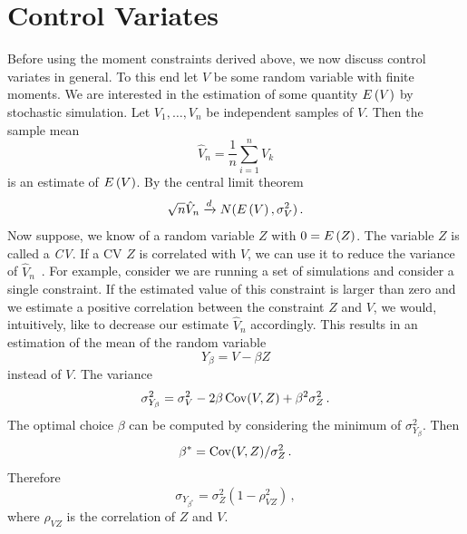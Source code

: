 \section{Control Variates}\label{sec:cv:var_red}
Before using the moment constraints derived above, we now discuss
control variates in general.
To this end let $V$ be some random variable with finite moments.
We are interested in the estimation of some quantity ${E}\left(V\right)$
by stochastic simulation.
Let $V_1,\dots,V_n$ be independent samples of $V$.
Then the sample mean
\[
  \hat{V}_n =\frac{1}{n}\sum_{i=1}^n V_k
\]
is an estimate of ${E}\left(V\right)$.  By the central limit theorem
\[
  \sqrt{n}\hat{V}_n\xrightarrow{d}N({E}\left(V\right),\sigma_V^2)\,.
\]
Now suppose, we know of a random variable $Z$ with $0={E}\left(Z\right)$.
The variable $Z$ is called a \emph{\acf{CV}}.
If a \acl{CV} $Z$ is correlated with $V$, we can
use it to
reduce the variance of
$\hat{V}_n$~\parencite{glasserman2005large,nelson1990control,szechtman2003control,wilson1984variance}.
For example, consider we are running a set of simulations and consider a single
constraint.
If the estimated value of this constraint is larger than zero and we
estimate a positive correlation
between the constraint $Z$ and $V$, we would, intuitively, like to
{decrease} our
estimate $\hat{V}_n$ accordingly.
This results in an estimation of the mean of the random variable
\[
  Y_{\beta}= V-\beta Z
\]
instead of $V$.
The variance%
\[
  \sigma_{Y_{\beta}}^2 = \sigma_V^2-2\beta \operatorname*{Cov}(V, Z) + \beta^2\sigma_Z^2\,.
\]
The optimal choice $\beta$ can be computed by  considering the
minimum of $\sigma_{Y_\beta}^2$. Then
\[
  \beta^{*}={\operatorname*{Cov}(V, Z)}/{\sigma_Z^2}\,.
\]
Therefore
\[
  \sigma_{Y_{\beta^{*}}}=\sigma_Z^2(1 - \rho_{VZ}^2)\,,
\]
where $\rho_{VZ}$ is the correlation of $Z$ and $V$.

